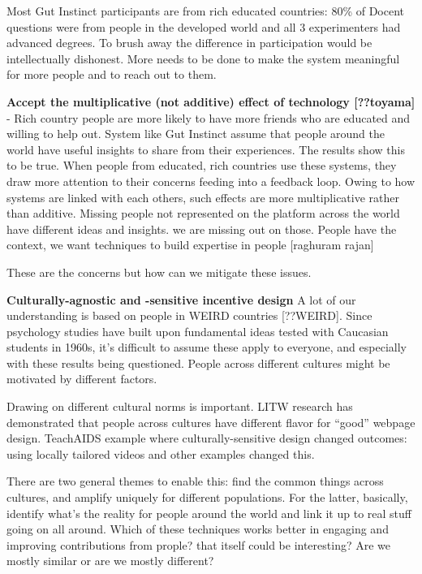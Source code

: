 Most Gut Instinct participants are from rich educated countries: 80\% of Docent questions were from people in the developed world and all 3 experimenters had advanced degrees. To brush away the difference in participation would be intellectually dishonest. More needs to be done to make the system meaningful for more people and to reach out to them. 

\textbf{Accept the multiplicative (not additive) effect of technology [??toyama]} - Rich country people are more likely to have more friends who are educated and willing to help out. System like Gut Instinct assume that people around the world have useful insights to share from their experiences. The results show this to be true. When people from educated, rich countries use these systems, they draw more attention to their concerns feeding into a feedback loop. Owing to how systems are linked with each others, such effects are more multiplicative rather than additive.  Missing people not represented on the platform across the world have different ideas and insights. we are missing out on those. People have the context, we want techniques to build expertise in people [raghuram rajan]

These are the concerns but how can we mitigate these issues.


\textbf{Culturally-agnostic and -sensitive incentive design}
A lot of our understanding is based on people in WEIRD countries [??WEIRD]. Since psychology studies have built upon fundamental ideas tested with Caucasian students in 1960s, it’s difficult to assume these apply to everyone, and especially with these results being questioned. People across different cultures might be motivated by different factors. 

Drawing on different cultural norms is important. LITW research has demonstrated that people across cultures have different flavor for “good” webpage design. TeachAIDS example where culturally-sensitive design changed outcomes: using locally tailored videos and other examples changed this.

There are two general themes to enable this: find the common things across cultures, and amplify uniquely for different populations. For the latter, basically, identify what’s the reality for people around the world and link it up to real stuff going on all around. Which of these techniques works better in engaging and improving contributions from prople? that itself could be interesting? Are we mostly similar or are we mostly different?

